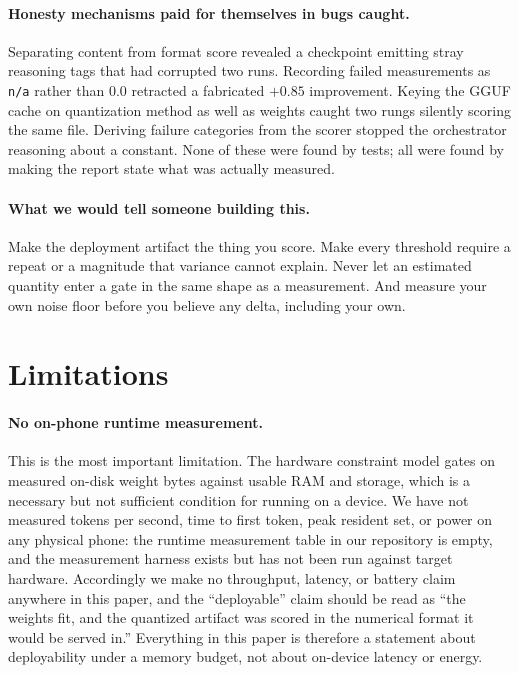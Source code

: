 \documentclass[sigconf,10pt]{acmart}
\begin{document}
\paragraph{Honesty mechanisms paid for themselves in bugs caught.} Separating content from
format score revealed a checkpoint emitting stray reasoning tags that had corrupted two runs.
Recording failed measurements as \texttt{n/a} rather than $0.0$ retracted a fabricated
$+0.85$ improvement. Keying the GGUF cache on quantization method as well as weights caught
two rungs silently scoring the same file. Deriving failure categories from the scorer stopped
the orchestrator reasoning about a constant. None of these were found by tests; all were found
by making the report state what was actually measured.

\paragraph{What we would tell someone building this.} Make the deployment artifact the thing
you score. Make every threshold require a repeat or a magnitude that variance cannot explain.
Never let an estimated quantity enter a gate in the same shape as a measurement. And measure
your own noise floor before you believe any delta, including your own.

\section{Limitations}
\label{sec:limitations}

\paragraph{No on-phone runtime measurement.} This is the most important limitation.
The hardware constraint model gates on measured on-disk weight bytes against usable RAM and
storage, which is a necessary but not sufficient condition for running on a device. We have
not measured tokens per second, time to first token, peak resident set, or power on any
physical phone: the runtime measurement table in our repository is empty, and the measurement
harness exists but has not been run against target hardware. Accordingly we make no
throughput, latency, or battery claim anywhere in this paper, and the ``deployable'' claim
should be read as ``the weights fit, and the quantized artifact was scored in the numerical
format it would be served in.'' Everything in this paper is therefore a statement about
deployability under a memory budget, not about on-device latency or energy.
\end{document}
